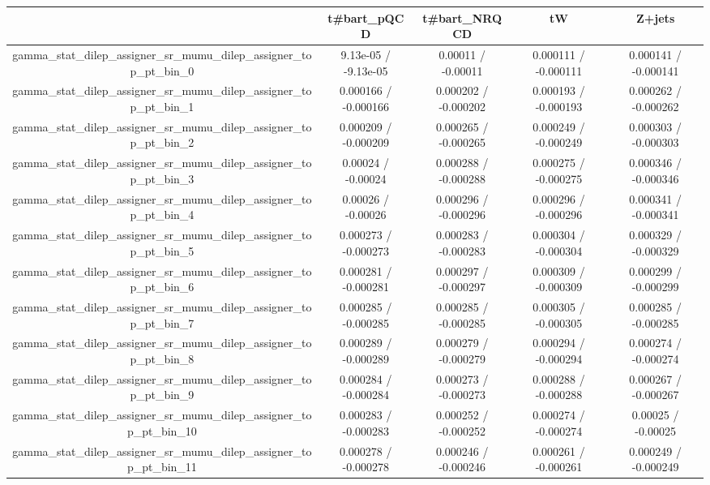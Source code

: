 \documentclass[10pt]{article}
\begin{document}
\begin{table}[htbp]
\begin{center}
\begin{tabular}{|c|c|c|c|c|}
\hline 
      & t#bar{t}_{pQCD}      & t#bar{t}_{NRQCD}      & tW      & Z+jets \\ 
\hline 
  gamma_stat_dilep_assigner_sr_mumu_dilep_assigner_top_pt_bin_0 & 9.13e-05 / -9.13e-05 & 0.00011 / -0.00011 & 0.000111 / -0.000111 & 0.000141 / -0.000141 \\ 
  gamma_stat_dilep_assigner_sr_mumu_dilep_assigner_top_pt_bin_1 & 0.000166 / -0.000166 & 0.000202 / -0.000202 & 0.000193 / -0.000193 & 0.000262 / -0.000262 \\ 
  gamma_stat_dilep_assigner_sr_mumu_dilep_assigner_top_pt_bin_2 & 0.000209 / -0.000209 & 0.000265 / -0.000265 & 0.000249 / -0.000249 & 0.000303 / -0.000303 \\ 
  gamma_stat_dilep_assigner_sr_mumu_dilep_assigner_top_pt_bin_3 & 0.00024 / -0.00024 & 0.000288 / -0.000288 & 0.000275 / -0.000275 & 0.000346 / -0.000346 \\ 
  gamma_stat_dilep_assigner_sr_mumu_dilep_assigner_top_pt_bin_4 & 0.00026 / -0.00026 & 0.000296 / -0.000296 & 0.000296 / -0.000296 & 0.000341 / -0.000341 \\ 
  gamma_stat_dilep_assigner_sr_mumu_dilep_assigner_top_pt_bin_5 & 0.000273 / -0.000273 & 0.000283 / -0.000283 & 0.000304 / -0.000304 & 0.000329 / -0.000329 \\ 
  gamma_stat_dilep_assigner_sr_mumu_dilep_assigner_top_pt_bin_6 & 0.000281 / -0.000281 & 0.000297 / -0.000297 & 0.000309 / -0.000309 & 0.000299 / -0.000299 \\ 
  gamma_stat_dilep_assigner_sr_mumu_dilep_assigner_top_pt_bin_7 & 0.000285 / -0.000285 & 0.000285 / -0.000285 & 0.000305 / -0.000305 & 0.000285 / -0.000285 \\ 
  gamma_stat_dilep_assigner_sr_mumu_dilep_assigner_top_pt_bin_8 & 0.000289 / -0.000289 & 0.000279 / -0.000279 & 0.000294 / -0.000294 & 0.000274 / -0.000274 \\ 
  gamma_stat_dilep_assigner_sr_mumu_dilep_assigner_top_pt_bin_9 & 0.000284 / -0.000284 & 0.000273 / -0.000273 & 0.000288 / -0.000288 & 0.000267 / -0.000267 \\ 
  gamma_stat_dilep_assigner_sr_mumu_dilep_assigner_top_pt_bin_10 & 0.000283 / -0.000283 & 0.000252 / -0.000252 & 0.000274 / -0.000274 & 0.00025 / -0.00025 \\ 
  gamma_stat_dilep_assigner_sr_mumu_dilep_assigner_top_pt_bin_11 & 0.000278 / -0.000278 & 0.000246 / -0.000246 & 0.000261 / -0.000261 & 0.000249 / -0.000249 \\ 

\end{tabular}
\end{center}
\end{table}
\end{document}
